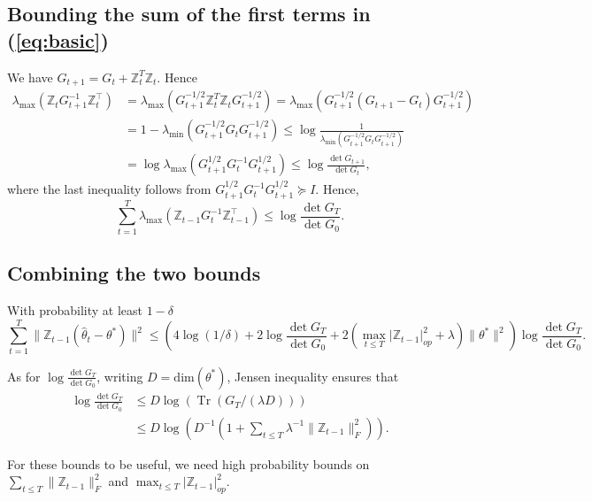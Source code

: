 \documentclass{article}
\theoremstyle{definition}
\newcommand{\pa}[1]{\left(#1\right)}
\newcommand{\bbZ}{\mathbb{Z}}
\newcommand{\hte}{\widehat \theta}
\begin{document}
  
 \subsection{Bounding the sum of the first terms in (\ref{eq:basic})}
 We have $G_{t+1}=G_{t} + \bbZ^T_{t}\bbZ_{t}$. Hence 
\begin{align*}
 \lambda_{\max} \left( \mathbb{Z}_{t} G_{t+1}^{-1} \mathbb{Z}_{t}^{\top} \right) &= \lambda_{\max} \left( G_{t+1}^{-1 / 2} \mathbb{Z}_{t}^{T} \mathbb{Z}_{t} G_{t+1}^{-1 / 2} \right)
 = \lambda_{\max} \left( G_{t+1}^{-1 / 2} \left( G_{t+1} - G_{t} \right) G_{t+1}^{-1 / 2} \right) \\
& = 1 - \lambda_{\min} \left( G_{t+1}^{-1 / 2} G_{t} G_{t+1}^{-1 / 2} \right) 
 \leq \log \frac{1}{\lambda_{\min} \left( G_{t+1}^{-1 / 2} G_{t} G_{t+1}^{-1 / 2} \right)}\\
 & = \log \lambda_{\max} \left( G_{t+1}^{1 / 2} G_{t}^{-1} G_{t+1}^{1 / 2} \right)\leq \log \frac{\operatorname{det} G_{t+1}}{\operatorname{det} G_{t}},
\end{align*}
where the last inequality follows from $G_{t+1}^{1 / 2} G_{t}^{-1} G_{t+1}^{1 / 2} \succeq I$.
Hence,
$$\sum_{t=1}^T \lambda_{\max} \left( \mathbb{Z}_{t-1} G_{t}^{-1} \mathbb{Z}_{t-1}^{\top} \right)\leq \log \frac{\operatorname{det} G_{T}}{\operatorname{det} G_{0}}.$$
 
\subsection{Combining the two bounds} 
 With probability at least $1-\delta$
$$\sum_{t=1}^{T}\|\bbZ_{t-1} (\hte_{t}-\theta^*)\|^2 \leq \pa{4\log(1/\delta)+2\log \frac{\operatorname{det} G_{T}}{\operatorname{det} G_{0}} + 2  \pa{ \max_{t\leq T}|\bbZ_{t-1} |^2_{op}+\lambda} \|\theta^*\|^2} \log \frac{\operatorname{det} G_{T}}{\operatorname{det} G_{0}} .$$

As for $\log \frac{\operatorname{det} G_{T}}{\operatorname{det} G_{0}}$, writing $D=\textrm{dim}(\theta^*)$, Jensen inequality ensures that
\begin{align*}
\log \frac{\operatorname{det} G_{T}}{\operatorname{det} G_{0}}&\leq D\log\pa{\operatorname{Tr}(G_{T}/(\lambda D))} \\
&\leq D\log \pa{D^{-1}\pa{1+\sum_{t\leq T}\lambda^{-1}\|\bbZ_{t-1}\|^2_{F}}}.
\end{align*}


For these bounds to be useful, we need high probability bounds on $\sum_{t\leq T}\|\bbZ_{t-1}\|^2_{F}$ and $ \max_{t\leq T}|\bbZ_{t-1} |^2_{op}$.
\end{document}
